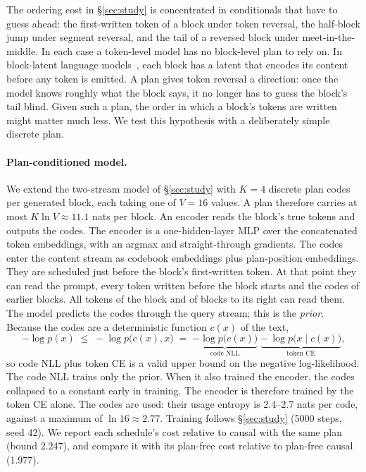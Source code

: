 \documentclass[11pt]{article}
\theoremstyle{definition}
\theoremstyle{remark}
\newcommand{\sch}[1]{\textsf{#1}}
\begin{document}
The ordering cost in \S\ref{sec:study} is concentrated in conditionals that have to guess ahead: the first-written token of a block under token reversal, the half-block jump under segment reversal, and the tail of a reversed block under meet-in-the-middle.
In each case a token-level model has no block-level plan to rely on.
In block-latent language models~\citep{shao2025calm,he2026psf,li2026lclm}, each block has a latent that encodes its content before any token is emitted.
A plan gives token reversal a direction: once the model knows roughly what the block says, it no longer has to guess the block's tail blind.
Given such a plan, the order in which a block's tokens are written might matter much less.
We test this hypothesis with a deliberately simple discrete plan.

\paragraph{Plan-conditioned model.}
We extend the two-stream model of \S\ref{sec:study} with $K=4$ discrete plan codes per generated block, each taking one of $V=16$ values.
A plan therefore carries at most $K\ln V\approx11.1$ nats per block.
An encoder reads the block's true tokens and outputs the codes.
The encoder is a one-hidden-layer MLP over the concatenated token embeddings, with an argmax and straight-through gradients.
The codes enter the content stream as codebook embeddings plus plan-position embeddings.
They are scheduled just before the block's first-written token.
At that point they can read the prompt, every token written before the block starts and the codes of earlier blocks.
All tokens of the block and of blocks to its right can read them.
The model predicts the codes through the query stream; this is the \emph{prior}.
Because the codes are a deterministic function $c(x)$ of the text,
\begin{equation}
  -\log p(x)\;\le\;-\log p\big(c(x),x\big)\;=\;\underbrace{-\log p\big(c(x)\big)}_{\text{code NLL}}\;\underbrace{-\,\log p\big(x\mid c(x)\big)}_{\text{token CE}},
  \label{eq:planbound}
\end{equation}
so code NLL plus token CE is a valid upper bound on the negative log-likelihood.
The code NLL trains only the prior.
When it also trained the encoder, the codes collapsed to a constant early in training.
The encoder is therefore trained by the token CE alone.
The codes are used: their usage entropy is 2.4--2.7 nats per code, against a maximum of $\ln16\approx2.77$.
Training follows \S\ref{sec:study} (5000 steps, seed 42).
We report each schedule's cost relative to \sch{causal} with the same plan (bound 2.247), and compare it with its plan-free cost relative to plan-free \sch{causal} (1.977).
\end{document}
